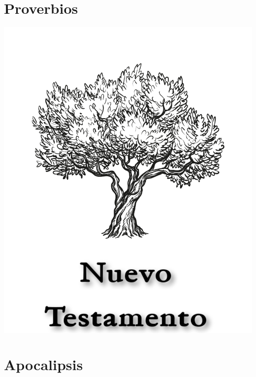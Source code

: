 \documentclass[14pt, b5paper, twoside]{extbook}
\begin{document}
\chapter{Proverbios}
\begin{multicols}{2}
  
\end{multicols}
\newpage

\pagestyle{empty}

\null\vfill
\begin{center}
\begin{minipage}[c]{\textwidth}
  \begin{center}
  \includegraphics{NuevoTestamentoTitulo.pdf}
  \end{center}
\end{minipage}
\end{center}
\null\vfill
\newpage

\chapter{Apocalipsis}
\begin{multicols}{2}
  \parskip=0pt \relax
  
\end{multicols}
\newpage
\end{document}
